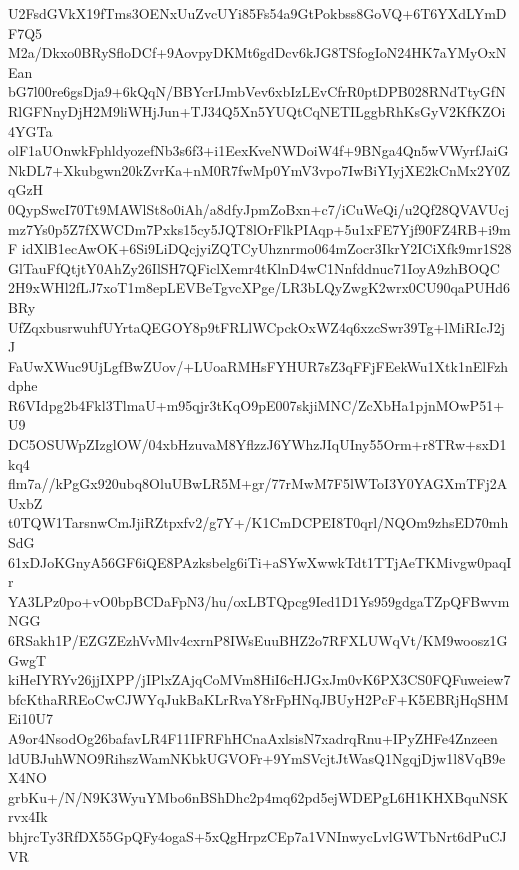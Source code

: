 U2FsdGVkX19fTms3OENxUuZvcUYi85Fs54a9GtPokbss8GoVQ+6T6YXdLYmDF7Q5
M2a/Dkxo0BRySfloDCf+9AovpyDKMt6gdDcv6kJG8TSfogIoN24HK7aYMyOxNEan
bG7l00re6gsDja9+6kQqN/BBYcrIJmbVev6xbIzLEvCfrR0ptDPB028RNdTtyGfN
RlGFNnyDjH2M9liWHjJun+TJ34Q5Xn5YUQtCqNETILggbRhKsGyV2KfKZOi4YGTa
olF1aUOnwkFphldyozefNb3s6f3+i1EexKveNWDoiW4f+9BNga4Qn5wVWyrfJaiG
NkDL7+Xkubgwn20kZvrKa+nM0R7fwMp0YmV3vpo7IwBiYIyjXE2kCnMx2Y0ZqGzH
0QypSwcI70Tt9MAWlSt8o0iAh/a8dfyJpmZoBxn+c7/iCuWeQi/u2Qf28QVAVUcj
mz7Ys0p5Z7fXWCDm7Pxks15cy5JQT8lOrFlkPIAqp+5u1xFE7Yjf90FZ4RB+i9mF
idXlB1ecAwOK+6Si9LiDQcjyiZQTCyUhznrmo064mZocr3IkrY2ICiXfk9mr1S28
GlTauFfQtjtY0AhZy26IlSH7QFiclXemr4tKlnD4wC1Nnfddnuc71IoyA9zhBOQC
2H9xWHl2fLJ7xoT1m8epLEVBeTgvcXPge/LR3bLQyZwgK2wrx0CU90qaPUHd6BRy
UfZqxbusrwuhfUYrtaQEGOY8p9tFRLlWCpckOxWZ4q6xzcSwr39Tg+lMiRIcJ2jJ
FaUwXWuc9UjLgfBwZUov/+LUoaRMHsFYHUR7sZ3qFFjFEekWu1Xtk1nElFzhdphe
R6VIdpg2b4Fkl3TlmaU+m95qjr3tKqO9pE007skjiMNC/ZcXbHa1pjnMOwP51+U9
DC5OSUWpZIzglOW/04xbHzuvaM8YflzzJ6YWhzJIqUIny55Orm+r8TRw+sxD1kq4
flm7a//kPgGx920ubq8OluUBwLR5M+gr/77rMwM7F5lWToI3Y0YAGXmTFj2AUxbZ
t0TQW1TarsnwCmJjiRZtpxfv2/g7Y+/K1CmDCPEI8T0qrl/NQOm9zhsED70mhSdG
61xDJoKGnyA56GF6iQE8PAzksbelg6iTi+aSYwXwwkTdt1TTjAeTKMivgw0paqIr
YA3LPz0po+vO0bpBCDaFpN3/hu/oxLBTQpcg9Ied1D1Ys959gdgaTZpQFBwvmNGG
6RSakh1P/EZGZEzhVvMlv4cxrnP8IWsEuuBHZ2o7RFXLUWqVt/KM9woosz1GGwgT
kiHeIYRYv26jjIXPP/jIPlxZAjqCoMVm8HiI6cHJGxJm0vK6PX3CS0FQFuweiew7
bfcKthaRREoCwCJWYqJukBaKLrRvaY8rFpHNqJBUyH2PcF+K5EBRjHqSHMEi10U7
A9or4NsodOg26bafavLR4F11IFRFhHCnaAxlsisN7xadrqRnu+IPyZHFe4Znzeen
ldUBJuhWNO9RihszWamNKbkUGVOFr+9YmSVcjtJtWasQ1NgqjDjw1l8VqB9eX4NO
grbKu+/N/N9K3WyuYMbo6nBShDhc2p4mq62pd5ejWDEPgL6H1KHXBquNSKrvx4Ik
bhjrcTy3RfDX55GpQFy4ogaS+5xQgHrpzCEp7a1VNInwycLvlGWTbNrt6dPuCJVR
